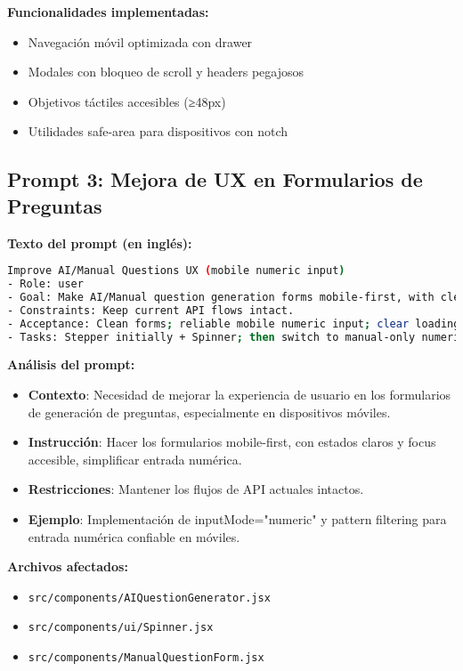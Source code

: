 \documentclass[12pt,a4paper]{article}
\begin{document}
\textbf{Funcionalidades implementadas:}
\begin{itemize}
    \item Navegación móvil optimizada con drawer
    \item Modales con bloqueo de scroll y headers pegajosos
    \item Objetivos táctiles accesibles (≥48px)
    \item Utilidades safe-area para dispositivos con notch
\end{itemize}

\subsection{Prompt 3: Mejora de UX en Formularios de Preguntas}

\textbf{Texto del prompt (en inglés):}
\begin{lstlisting}[language=bash]
Improve AI/Manual Questions UX (mobile numeric input)
- Role: user
- Goal: Make AI/Manual question generation forms mobile-first, with clear states and accessible focus; simplify numeric input.
- Constraints: Keep current API flows intact.
- Acceptance: Clean forms; reliable mobile numeric input; clear loading/error feedback.
- Tasks: Stepper initially + Spinner; then switch to manual-only numeric input with `inputMode="numeric"` and `pattern` filtering; empty by default; validations on blur; show helper text.
\end{lstlisting}

\textbf{Análisis del prompt:}
\begin{itemize}
    \item \textbf{Contexto}: Necesidad de mejorar la experiencia de usuario en los formularios de generación de preguntas, especialmente en dispositivos móviles.
    \item \textbf{Instrucción}: Hacer los formularios mobile-first, con estados claros y focus accesible, simplificar entrada numérica.
    \item \textbf{Restricciones}: Mantener los flujos de API actuales intactos.
    \item \textbf{Ejemplo}: Implementación de inputMode="numeric" y pattern filtering para entrada numérica confiable en móviles.
\end{itemize}

\textbf{Archivos afectados:}
\begin{itemize}
    \item \texttt{src/components/AIQuestionGenerator.jsx}
    \item \texttt{src/components/ui/Spinner.jsx}
    \item \texttt{src/components/ManualQuestionForm.jsx}
\end{itemize}
\end{document}
